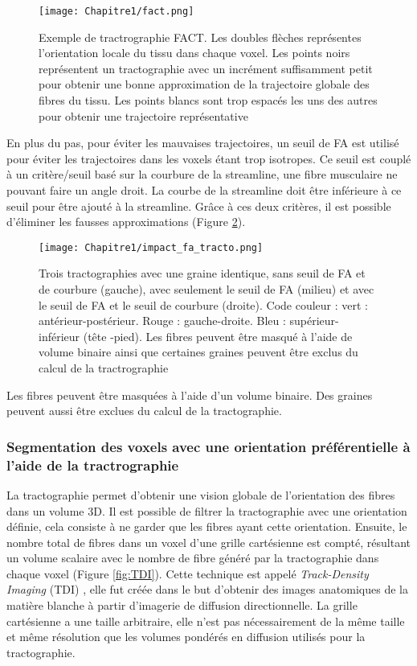 \begin{figure}[!h]
  \begin{center}
    \texttt{[image: Chapitre1/fact.png]}
     \end{center}
    \caption{Exemple de tractrographie FACT. Les doubles flèches représentes l’orientation locale du tissu dans chaque voxel. Les points noirs représentent un tractographie avec un incrément suffisamment petit pour obtenir une bonne approximation de la trajectoire globale des fibres du tissu. Les points blancs sont trop espacés les uns des autres pour obtenir une trajectoire représentative}
  \label{fig:FACT}
\end{figure}
\clearpage
En plus du pas, pour éviter les mauvaises trajectoires, un seuil de FA est utilisé pour éviter les trajectoires dans les voxels étant trop isotropes. Ce seuil est couplé à un critère/seuil basé sur la courbure de la streamline, une fibre musculaire ne pouvant faire un angle droit. La courbe de la streamline doit être inférieure à ce seuil pour être ajouté à la streamline. Grâce à ces deux critères, il est possible d’éliminer les fausses approximations (Figure \ref{fig:impact_FA}).

 \begin{figure}[!h]
  \begin{center}
    \texttt{[image: Chapitre1/impact\_fa\_tracto.png]}
     \end{center}
    \caption{Trois tractographies avec une graine identique, sans seuil de FA et de courbure (gauche), avec seulement le seuil de FA (milieu) et avec le seuil de FA et le seuil de courbure (droite). Code couleur : vert : antérieur-postérieur. Rouge : gauche-droite. Bleu : supérieur-inférieur (tête -pied).
Les fibres peuvent être masqué à l’aide de volume binaire ainsi que certaines graines peuvent être exclus du calcul de la tractrographie}
  \label{fig:impact_FA}
\end{figure}

Les fibres peuvent être masquées à l'aide d'un volume binaire. Des graines peuvent aussi être exclues du calcul de la tractographie.
\clearpage
\subsubsection{Segmentation des voxels avec une orientation préférentielle à l’aide de la tractrographie}


La tractographie permet d’obtenir une vision globale de l’orientation des fibres dans un volume 3D. Il est possible de filtrer la tractographie avec une orientation définie, cela consiste à ne garder que les fibres ayant cette orientation. Ensuite, le nombre total de fibres dans un voxel d’une grille cartésienne est compté, résultant un volume scalaire avec le nombre de fibre généré par la tractographie dans chaque voxel (Figure \ref{fig:TDI}). Cette technique est appelé \textit{Track-Density Imaging} (TDI) \cite{Calamante2010}, elle fut créée dans le but d’obtenir des images anatomiques de la matière blanche à partir d’imagerie de diffusion directionnelle. La grille cartésienne a une taille arbitraire, elle n’est pas nécessairement de la même taille et même résolution que les volumes pondérés en diffusion utilisés pour la tractographie.

